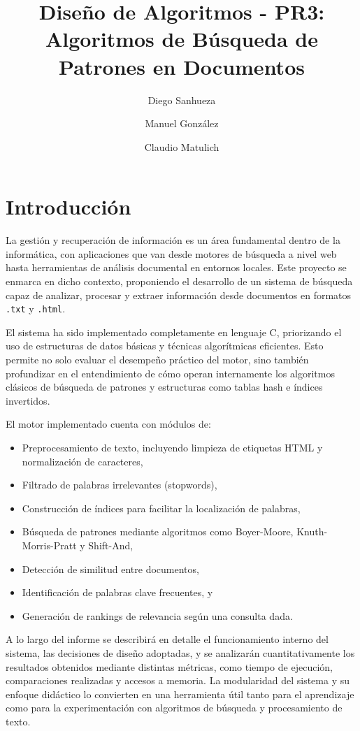 \documentclass[9pt,letterpaper,onecolumn]{rho-class/rho}
\title{}
\author[$\dagger$]{Diego Sanhueza}
\author[$\dagger$]{Manuel González}
\author[$\dagger$]{Claudio Matulich}
\affil[$\dagger$]{Universidad de Magallanes}
\title{Diseño de Algoritmos - PR3: Algoritmos de Búsqueda de Patrones en Documentos}
\begin{document}
\maketitle
\thispagestyle{firststyle}
\tableofcontents

\section{Introducción}

La gestión y recuperación de información es un área fundamental dentro de la informática, con aplicaciones que van desde motores de búsqueda a nivel web hasta herramientas de análisis documental en entornos locales. Este proyecto se enmarca en dicho contexto, proponiendo el desarrollo de un sistema de búsqueda capaz de analizar, procesar y extraer información desde documentos en formatos \texttt{.txt} y \texttt{.html}.

El sistema ha sido implementado completamente en lenguaje C, priorizando el uso de estructuras de datos básicas y técnicas algorítmicas eficientes. Esto permite no solo evaluar el desempeño práctico del motor, sino también profundizar en el entendimiento de cómo operan internamente los algoritmos clásicos de búsqueda de patrones y estructuras como tablas hash e índices invertidos.

El motor implementado cuenta con módulos de:
\begin{itemize}
    \item Preprocesamiento de texto, incluyendo limpieza de etiquetas HTML y normalización de caracteres,
    \item Filtrado de palabras irrelevantes (stopwords),
    \item Construcción de índices para facilitar la localización de palabras,
    \item Búsqueda de patrones mediante algoritmos como Boyer-Moore, Knuth-Morris-Pratt y Shift-And,
    \item Detección de similitud entre documentos,
    \item Identificación de palabras clave frecuentes, y
    \item Generación de rankings de relevancia según una consulta dada.
\end{itemize}

A lo largo del informe se describirá en detalle el funcionamiento interno del sistema, las decisiones de diseño adoptadas, y se analizarán cuantitativamente los resultados obtenidos mediante distintas métricas, como tiempo de ejecución, comparaciones realizadas y accesos a memoria. La modularidad del sistema y su enfoque didáctico lo convierten en una herramienta útil tanto para el aprendizaje como para la experimentación con algoritmos de búsqueda y procesamiento de texto.
\end{document}
